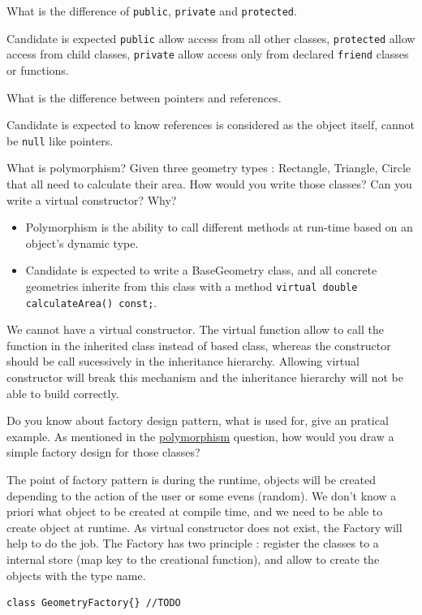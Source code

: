\documentclass{exam}%
\begin{document}
\begin{questions}
\question What is the difference of \lstinline{public}, \lstinline{private} and \lstinline{protected}.
\begin{solution}[.2in]
	Candidate is expected \lstinline{public} allow access from all other classes, \lstinline{protected} allow access from child classes, \lstinline{private} allow access only from declared \lstinline{friend} classes or functions.
\end{solution}

\question What is the difference between pointers and references.
\begin{solution}[.2in]
    Candidate is expected to know references is considered as the object itself, cannot be \lstinline{null} like pointers.
\end{solution}

\question \label{cpp:dynamic_polymorphism}What is polymorphism? Given three geometry types : Rectangle, Triangle, Circle that all need to calculate their area. How would you write those classes? Can you write a virtual constructor? Why?
\begin{solution}[.2in]
\begin{itemize}
	\item Polymorphism is the ability to call different methods at run-time based on an object’s dynamic type. 
	\item Candidate is expected to write a BaseGeometry class, and all concrete geometries inherite from this class with a method \lstinline{virtual double calculateArea() const;}.
\end{itemize}
We cannot have a virtual constructor. The virtual function allow to call the function in the inherited class instead of based class, whereas the constructor should be call sucessively in the inheritance hierarchy. Allowing virtual constructor will break this mechanism and the inheritance hierarchy will not be able to build correctly.
\end{solution}

\question Do you know about factory design pattern, what is used for, give an pratical example. As mentioned in the  \hyperref[cpp:dynamic_polymorphism]{polymorphism} question, how would you draw a simple factory design for those classes?
\begin{solution}[.2in]
The point of factory pattern is during the runtime, objects will be created depending to the action of the user or some evens (random). We don't know a priori what object to be created at compile time, and we need to be able to  create object at runtime. As virtual constructor does not exist, the Factory will help to do the job. The Factory has two principle : register the classes to a internal store (map key to the creational function), and allow to create the objects with the type name.
\begin{lstlisting}
class GeometryFactory{} //TODO
\end{lstlisting}
\end{solution}


\end{questions}
\end{document}
